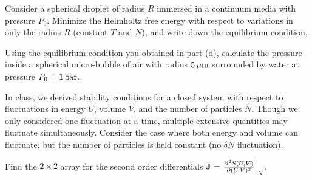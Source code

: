 \smallskip\subp
Consider a spherical droplet of radius $R$ immersed in
a continuum media with pressure $P_0$.
Minimize the Helmholtz free energy with respect to variations
in only the radius $R$ (constant $T$ and $N$),
and write down the equilibrium condition.

\smallskip\subp 
Using the equilibrium condition you obtained in part (d),
calculate the pressure inside a spherical micro-bubble of air
with radius $\rm5\,\mu m$ surrounded by water at pressure $P_0=1\,\rm bar$.

\bigskip{}
In class, we derived stability conditions for a closed system
with respect to fluctuations in 
energy $U$, volume $V$, and the number of particles $N$.
Though we only considered one fluctuation at a time, 
multiple extensive quantities may fluctuate simultaneously.
Consider the case where both energy and volume can fluctuate,
but the number of particles is held constant (no $\delta N$ fluctuation).

\smallskip\subp Find the $2\times2$ array for the second order differentials
${\bf J} = \left.\frac{\partial^2 S(U,V)}{\partial(U,V)^2}\right|_N $.


